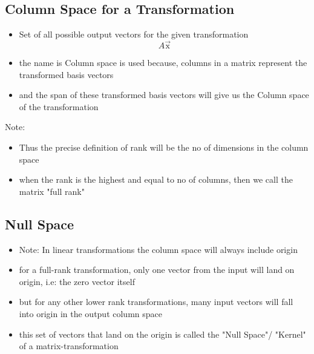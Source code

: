 \documentclass[a4paper]{article}
\begin{document}
\subsection{Column Space for a Transformation}
\begin{itemize}
	\item Set of all possible output vectors for the given transformation
	      \[
		      A \vec{\text{x}}
	      \]
	\item the name is Column space is used because,
	      columns in a matrix represent the transformed basis vectors
	\item and the span of these transformed basis vectors will give us the
	      Column space of the transformation
\end{itemize}

Note:
\begin{itemize}
	\item Thus the precise definition of rank will be the no of dimensions in
	      the column space
	\item  when the rank is the highest and equal to no of columns,
	      then we call the matrix "full rank"
\end{itemize}

\subsection{Null Space}
\begin{itemize}
	\item Note: In linear transformations the column space will always include
	      origin
	\item for a full-rank transformation, only one vector from the input
	      will land on origin, i.e: the zero vector itself
	\item but for any other lower rank transformations, many input
	      vectors will fall into origin in the output column space
	\item this set of vectors that land on the origin is called the
	      "Null Space"/ "Kernel" of a matrix-transformation
\end{itemize}
\end{document}

